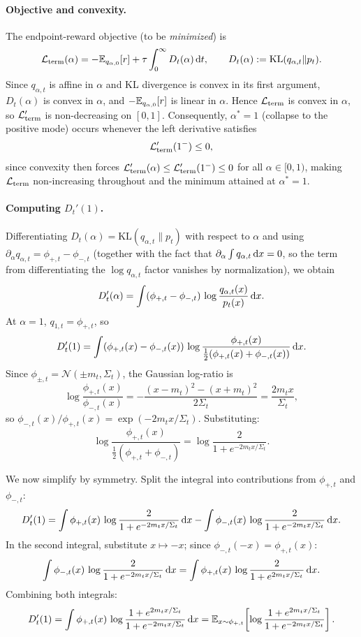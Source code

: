 \paragraph{Objective and convexity.}
The endpoint-reward objective (to be \emph{minimized}) is
\[
\mathcal{L}_{\rm term}(\alpha)
=
-\mathbb{E}_{q_{\alpha,0}}[r]
+
\tau\int_0^\infty
D_t(\alpha)\,\mathrm{d} t,
\qquad
D_t(\alpha):=
\mathrm{KL}(q_{\alpha,t}\|p_t).
\]
Since $q_{\alpha,t}$ is affine in $\alpha$ and KL divergence is convex in its first argument, $D_t(\alpha)$ is convex in $\alpha$, and $-\mathbb{E}_{q_{\alpha,0}}[r]$ is linear in $\alpha$. Hence $\mathcal{L}_{\rm term}$ is convex in $\alpha$, so $\mathcal{L}_{\rm term}'$ is non-decreasing on $[0,1]$. Consequently, $\alpha^*=1$ (collapse to the positive mode) occurs whenever the left derivative satisfies
\[
\mathcal{L}_{\rm term}'(1^-)\le 0,
\]
since convexity then forces $\mathcal{L}_{\rm term}'(\alpha)\le\mathcal{L}_{\rm term}'(1^-)\le 0$ for all $\alpha\in[0,1)$, making $\mathcal{L}_{\rm term}$ non-increasing throughout and the minimum attained at $\alpha^*=1$.

\paragraph{Computing $D_t'(1)$.}
Differentiating $D_t(\alpha)=\mathrm{KL}(q_{\alpha,t}\|p_t)$ with respect to $\alpha$ and using $\partial_\alpha q_{\alpha,t}=\phi_{+,t}-\phi_{-,t}$ (together with the fact that $\partial_\alpha\int q_{\alpha,t}\,\mathrm{d} x=0$, so the term from differentiating the $\log q_{\alpha,t}$ factor vanishes by normalization), we obtain
\[
D_t'(\alpha)
=
\int
(\phi_{+,t}-\phi_{-,t})\,
\log\frac{q_{\alpha,t}(x)}{p_t(x)}
\,\mathrm{d} x.
\]
At $\alpha=1$, $q_{1,t}=\phi_{+,t}$, so
\[
D_t'(1)
=
\int
(\phi_{+,t}(x)-\phi_{-,t}(x))\,
\log\frac{\phi_{+,t}(x)}{\frac12(\phi_{+,t}(x)+\phi_{-,t}(x))}
\,\mathrm{d} x.
\]
Since $\phi_{\pm,t}=\mathcal{N}(\pm m_t,\Sigma_t)$, the Gaussian log-ratio is
\[
\log\frac{\phi_{+,t}(x)}{\phi_{-,t}(x)}
=
-\frac{(x-m_t)^2-(x+m_t)^2}{2\Sigma_t}
=
\frac{2m_t x}{\Sigma_t},
\]
so $\phi_{-,t}(x)/\phi_{+,t}(x)=\exp(-2m_t x/\Sigma_t)$. Substituting:
\[
\log\frac{\phi_{+,t}(x)}{\frac12(\phi_{+,t}+\phi_{-,t})}
=
\log\frac{2}{1+e^{-2m_tx/\Sigma_t}}.
\]

We now simplify by symmetry. Split the integral into contributions from $\phi_{+,t}$ and $\phi_{-,t}$:
\[
D_t'(1)
=
\int\phi_{+,t}(x)\,\log\frac{2}{1+e^{-2m_tx/\Sigma_t}}\,\mathrm{d} x
-
\int\phi_{-,t}(x)\,\log\frac{2}{1+e^{-2m_tx/\Sigma_t}}\,\mathrm{d} x.
\]
In the second integral, substitute $x\mapsto -x$; since $\phi_{-,t}(-x)=\phi_{+,t}(x)$:
\[
\int\phi_{-,t}(x)\,\log\frac{2}{1+e^{-2m_tx/\Sigma_t}}\,\mathrm{d} x
=
\int\phi_{+,t}(x)\,\log\frac{2}{1+e^{2m_tx/\Sigma_t}}\,\mathrm{d} x.
\]
Combining both integrals:
\begin{equation}
\label{eq:Dt_prime_1}
D_t'(1)
=
\int\phi_{+,t}(x)\,\log\frac{1+e^{2m_tx/\Sigma_t}}{1+e^{-2m_tx/\Sigma_t}}\,\mathrm{d} x
=
\mathbb{E}_{x\sim\phi_{+,t}}\!\left[\log\frac{1+e^{2m_tx/\Sigma_t}}{1+e^{-2m_tx/\Sigma_t}}\right].
\end{equation}

